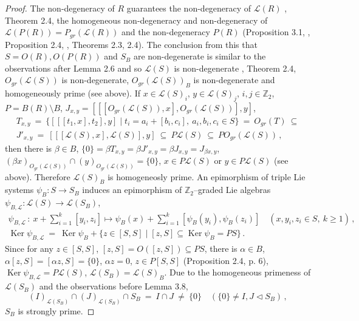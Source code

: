 \documentclass[a4paper,11pt]{article}
\DeclareMathOperator{\Ker}{Ker}
\begin{document}
\begin{proof}
The non-degeneracy of $R$ guarantees the non-degeneracy of $\mathcal{L}(R)$ 
\cite{NLS}, Theorem 2.4, the homogeneous non-degeneracy and non-degeneracy 
of ${\mathcal{L}(P(R))=P_{gr}(\mathcal{L}(R))}$ and the non-degeneracy $P(R)$ 
(Proposition 3.1, \cite{OMol}, Proposition 2.4, \cite{NLS}, 
Theorems 2.3, 2.4). The conclusion from this that ${S=O(R), O(P(R))}$ and $S_B$ 
are non-degenerate is similar to the observations after Lemma 2.6 and 
so $\mathcal{L}(S)$ is non-degenerate \cite{NLS}, Theorem 2.4, 
$O_{gr}(\mathcal{L}(S))$ is non-degenerate, 
$O_{gr}(\mathcal{L}(S))_B$ is non-degenerate and homogeneously prime (see 
above). If ${x\in \mathcal{L}(S)_i}$, ${y\in \mathcal{L}(S)_j}$, 
${i, j\in \mathbb{Z}_2}$, ${P=B(R)\setminus B}$, 
${J_{x, y}=[[[O_{gr}(\mathcal{L}(S)), x], O_{gr}(\mathcal{L}(S))], y]}$, 
\begin{multline*}
T_{x, y}\ =\ 
\{[[[t_1, x], t_2], y]\mid t_i=a_i+[b_i, c_i],\ a_i, b_i, c_i\in S\}\ =\ 
O_{gr}(T)\ \subseteq 
\\
J'_{x, y}\ =\ 
[[[\mathcal{L}(S), x], \mathcal{L}(S)], y]\ \subseteq\ 
P \mathcal{L}(S)\ \subseteq\ P O_{gr}(\mathcal{L}(S))\,,
\end{multline*}
then there is ${\beta\in B}$, 
${\{0\}=\beta T_{x, y}=\beta J'_{x, y}=\beta J_{x, y}=J_{\beta x, y}}$, 
${(\beta x)_{O_{gr}(\mathcal{L}(S))}\cap (y)_{O_{gr}(\mathcal{L}(S))}=\{0\}}$, 
${x\in P \mathcal{L}(S)}$ or ${y\in P \mathcal{L}(S)}$ (see above). 
Therefore $\mathcal{L}(S)_B$ is homogeneosly prime.
An epimorphism of triple Lie systems ${\psi_B: S\longrightarrow S_B}$ induces 
an epimorphism of $\mathbb{Z}_2$--graded Lie algebras 
${\psi_{B, \mathcal{L}}: \mathcal{L}(S)\longrightarrow \mathcal{L}(S_B)}$, 
\begin{gather*}
\psi_{B, \mathcal{L}}\,:\ x+\sum_{i=1}^k [y_i, z_i]\longmapsto 
\psi_B(x)+\sum_{i=1}^k [\psi_B(y_i), \psi_B(z_i)]\quad 
(x, y_i, z_i\in S,\ k\geq 1)\,,
\\
\Ker \psi_{B, \mathcal{L}}\ =\ \Ker \psi_B+
\{z\in [S, S]\mid [z, S]\subseteq \Ker \psi_B=P S\}\,.
\end{gather*}
Since for any ${z\in [S, S]}$, ${[z, S]=O([z, S])
\subseteq P S}$, there is ${\alpha\in B}$, 
$\alpha [z, S]=[\alpha z, S]=\{0\}$, ${\alpha z=0}$, ${z\in P [S, S]}$ 
(Proposition 2.4, p. 6), ${\Ker \psi_{B, \mathcal{L}}=P \mathcal{L}(S)}$, 
$\mathcal{L}(S_B)=\mathcal{L}(S)_B$. Due to the homogeneous primeness of 
$\mathcal{L}(S_B)$ and the observations before Lemma 3.8, 
\[
(I)_{\mathcal{L}(S_B)}\cap (J)_{\mathcal{L}(S_B)}\cap S_B\ =\ 
I\cap J\ \ne\ \{0\}\quad (\{0\}\ne I, J\lhd S_B)\,,
\]
$S_B$ is strongly prime.
\end{proof}
\end{document}
